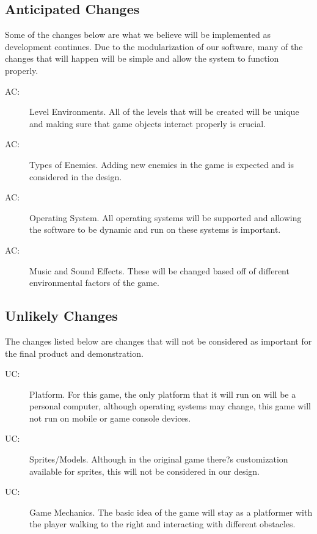 \documentclass[12pt, titlepage]{article}
\newcounter{acnum}
\newcommand{\actheacnum}{AC\theacnum}
\newcounter{ucnum}
\newcommand{\uctheucnum}{UC\theucnum}
\begin{document}
\subsection{Anticipated Changes} \label{SecAchange}

Some of the changes below are what we believe will be implemented as development continues. Due to the modularization of our software, many of the changes that will happen will be simple and allow the system to function properly.

\begin{description}
\item[ \actheacnum \label{acEnvironments}:] Level Environments. All of the levels that will be created will be unique and making sure that game objects interact properly is crucial.
\item[ \actheacnum \label{acEnemies}:] Types of Enemies. Adding new enemies in the game is expected and is considered in the design.
\item [ \actheacnum \label{acOperatingSys}:] Operating System. All operating systems will be supported and allowing the software to be dynamic and run on these systems is important.
\item [ \actheacnum \label{acMusic}:] Music and Sound Effects. These will be changed based off of different environmental factors of the game.
\end{description}

\subsection{Unlikely Changes} \label{SecUchange}

The changes listed below are changes that will not be considered as important for the final product and demonstration.

\begin{description}
\item[ \uctheucnum \label{ucPlatform}:] Platform. For this game, the only platform that it will run on will be a personal computer, although operating systems may change, this game will not run on mobile or game console devices.
\item[ \uctheucnum \label{ucSprites}:] Sprites/Models. Although in the original game there?s customization available for sprites, this will not be considered in our design.
\item[ \uctheucnum \label{ucMechanics}:] Game Mechanics. The basic idea of the game will stay as a platformer with the player walking to the right and interacting with different obstacles.
\end{description}
\end{document}
